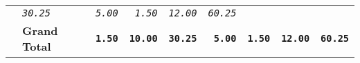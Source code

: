 \documentclass[11pt,A4paper,]{article}
\begin{document}
\begin{longtable}[]{@{}llrrrrrrr@{}}
\begin{minipage}[t]{0.11\columnwidth}
\end{minipage} & \begin{minipage}[t]{0.11\columnwidth}\raggedleft\strut
\emph{\texttt{30.25}}\strut
\end{minipage} & \begin{minipage}[t]{0.11\columnwidth}\raggedleft\strut
\emph{\texttt{5.00}}\strut
\end{minipage} & \begin{minipage}[t]{0.11\columnwidth}\raggedleft\strut
\emph{\texttt{1.50}}\strut
\end{minipage} & \begin{minipage}[t]{0.11\columnwidth}\raggedleft\strut
\emph{\texttt{12.00}}\strut
\end{minipage} & \begin{minipage}[t]{0.11\columnwidth}\raggedleft\strut
\emph{\texttt{60.25}}\strut
\end{minipage}\tabularnewline
\begin{minipage}[t]{0.11\columnwidth}\raggedright\strut
\strut
\end{minipage} & \begin{minipage}[t]{0.11\columnwidth}\raggedright\strut
\textbf{Grand Total}\strut
\end{minipage} & \begin{minipage}[t]{0.11\columnwidth}\raggedleft\strut
\textbf{\texttt{1.50}}\strut
\end{minipage} & \begin{minipage}[t]{0.11\columnwidth}\raggedleft\strut
\textbf{\texttt{10.00}}\strut
\end{minipage} & \begin{minipage}[t]{0.11\columnwidth}\raggedleft\strut
\textbf{\texttt{30.25}}\strut
\end{minipage} & \begin{minipage}[t]{0.11\columnwidth}\raggedleft\strut
\textbf{\texttt{5.00}}\strut
\end{minipage} & \begin{minipage}[t]{0.11\columnwidth}\raggedleft\strut
\textbf{\texttt{1.50}}\strut
\end{minipage} & \begin{minipage}[t]{0.11\columnwidth}\raggedleft\strut
\textbf{\texttt{12.00}}\strut
\end{minipage} & \begin{minipage}[t]{0.11\columnwidth}\raggedleft\strut
\textbf{\texttt{60.25}}\strut
\end{minipage}\tabularnewline
\bottomrule
\end{longtable}
\end{document}
